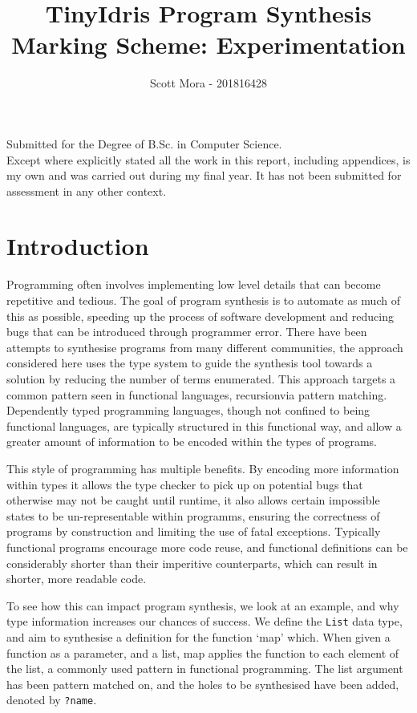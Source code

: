 \documentclass[a4paper]{article}
\author{Scott Mora - 201816428}
\date{}
\title{TinyIdris Program Synthesis\\\medskip
\large Marking Scheme: Experimentation}
\begin{document}
\maketitle
\begin{center}
\vspace{15mm}
Submitted for the Degree of B.Sc. in Computer Science. \\
\vspace{15mm}
Except where explicitly stated all the work in this report, including appendices, is my own and was carried out during my final year. It has not been submitted for assessment in any other context. 
 \end{center}
\clearpage
\tableofcontents
\clearpage

\section{Introduction}
\label{sec:orgf1aad56}

Programming often involves implementing low level details that can become
repetitive and tedious. The goal of program synthesis is to automate as much of this as
possible, speeding up the process of software development and reducing
bugs that can be introduced through programmer error. There have been
attempts to synthesise programs from many different communities,
the approach considered here uses the type system to guide the synthesis
tool towards a solution by reducing the number of terms enumerated.
This approach targets a common pattern seen in functional languages,
recursionvia pattern matching. Dependently typed programming languages, 
though not confined to being functional languages, are typically 
structured in this functional way, and allow a greater amount of 
information to be encoded within the types of programs. 

This style of programming has multiple benefits. By encoding more 
information within types it allows the type checker to pick up on 
potential bugs that otherwise may not be caught until runtime, it also 
allows certain impossible states to be un-representable within programms,
ensuring the correctness of programs by construction and limiting the use of fatal 
exceptions. Typically functional programs encourage more code reuse,
and functional definitions can be considerably shorter than their 
imperitive counterparts, which can result in shorter, more readable code.

To see how this can impact program synthesis, we look at an example, 
and why type information increases our chances of success. 
We define the \texttt{List} data type, and aim to synthesise a definition for
the function `map' which. When given a function as a parameter, and a 
list, map applies the function to each element of the list, a commonly 
used pattern in functional programming. The list argument has been
pattern matched on, and the holes to be synthesised have been added,
denoted by \texttt{?name}.
\end{document}
